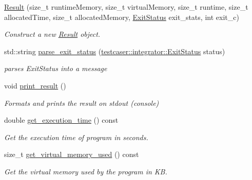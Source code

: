 \begin{DoxyCompactItemize}
\item 
\hyperlink{classtestcaser_1_1integrator_1_1Result_a74713e8425d62a6ea2e349b8255e3a95}{Result} (size\+\_\+t runtime\+Memory, size\+\_\+t virtual\+Memory, size\+\_\+t runtime, size\+\_\+t allocated\+Time, size\+\_\+t allocated\+Memory, \hyperlink{namespacetestcaser_1_1integrator_a68fcfdfd3f063954e9fd1a94f4b4f755}{Exit\+Status} exit\+\_\+stats, int exit\+\_\+c)
\begin{DoxyCompactList}\small\item\em Construct a new \hyperlink{classtestcaser_1_1integrator_1_1Result}{Result} object. \end{DoxyCompactList}\item 
std\+::string \hyperlink{classtestcaser_1_1integrator_1_1Result_a8803ea04076142e32e6784f0324b7186}{parse\+\_\+exit\+\_\+status} (\hyperlink{namespacetestcaser_1_1integrator_a68fcfdfd3f063954e9fd1a94f4b4f755}{testcaser\+::integrator\+::\+Exit\+Status} status)
\begin{DoxyCompactList}\small\item\em parses Exit\+Status into a message \end{DoxyCompactList}\item 
\mbox{\label{classtestcaser_1_1integrator_1_1Result_a941ae470ca06388faff84e0a3bf3e5e0}} 
void \hyperlink{classtestcaser_1_1integrator_1_1Result_a941ae470ca06388faff84e0a3bf3e5e0}{print\+\_\+result} ()
\begin{DoxyCompactList}\small\item\em Formats and prints the result on stdout (console) \end{DoxyCompactList}\item 
double \hyperlink{classtestcaser_1_1integrator_1_1Result_a6e6516249a0502cc5031760436b81c3c}{get\+\_\+execution\+\_\+time} () const
\begin{DoxyCompactList}\small\item\em Get the execution time of program in seconds. \end{DoxyCompactList}\item 
size\+\_\+t \hyperlink{classtestcaser_1_1integrator_1_1Result_a72b4929256f610e35f244412bb14b38d}{get\+\_\+virtual\+\_\+memory\+\_\+used} () const
\begin{DoxyCompactList}\small\item\em Get the virtual memory used by the program in KB. \end{DoxyCompactList}\item 

\end{DoxyCompactItemize}
